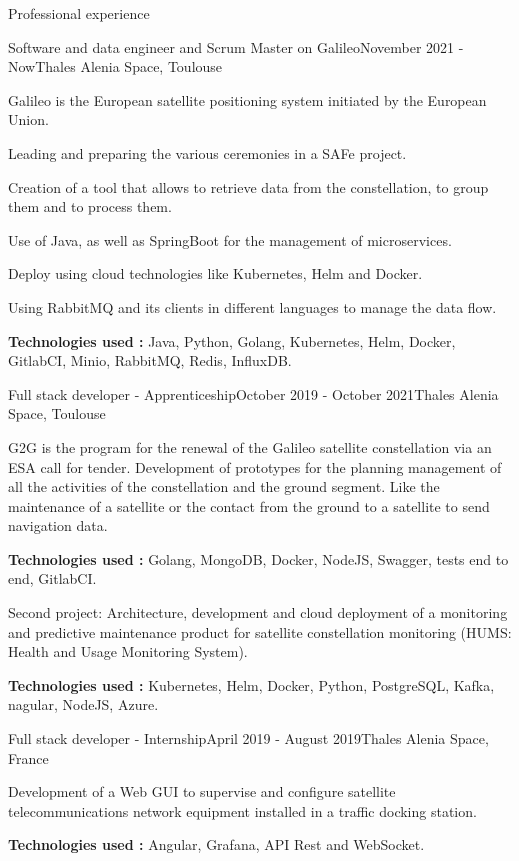 \documentclass[
	11pt, %
]{resume}
\begin{document}
\begin{rSection}{Professional experience}

	\begin{rSubsection}{Software and data engineer and Scrum Master on Galileo}{November 2021 - Now}{Thales Alenia Space, Toulouse}{}
		\item Galileo is the European satellite positioning system initiated by the European Union. 
		\item Leading and preparing the various ceremonies in a SAFe project.
		\item Creation of a tool that allows to retrieve data from the constellation, to group them and to process them.
 		\item Use of Java, as well as SpringBoot for the management of microservices.
 		\item Deploy using cloud technologies like Kubernetes, Helm and Docker.
 		\item Using RabbitMQ and its clients in different languages to manage the data flow.
		\item \textbf{Technologies used :} Java, Python, Golang, Kubernetes, Helm, Docker, GitlabCI, Minio, RabbitMQ, Redis, InfluxDB.
	\end{rSubsection}

	\begin{rSubsection}{Full stack developer - Apprenticeship}{October 2019 - October 2021}{Thales Alenia Space, Toulouse}{}
		\item G2G is the program for the renewal of the Galileo satellite constellation via an ESA call for tender. 
			Development of prototypes for the planning management of all the activities of the constellation and the ground segment. 
			Like the maintenance of a satellite or the contact from the ground to a satellite to send navigation data.
		\item \textbf{Technologies used :} Golang, MongoDB, Docker, NodeJS, Swagger, tests end to end, GitlabCI.
		\item Second project: Architecture, development and cloud deployment of a monitoring and predictive maintenance 
			product for satellite constellation monitoring (HUMS: Health and Usage Monitoring System).
		\item \textbf{Technologies used :} Kubernetes, Helm, Docker, Python, PostgreSQL, Kafka, nagular, NodeJS, Azure.
	\end{rSubsection}

	\begin{rSubsection}{Full stack developer - Internship}{April 2019 - August 2019}{Thales Alenia Space, France}{}
		\item Development of a Web GUI to supervise and configure satellite telecommunications network equipment installed in a traffic docking station.
		\item \textbf{Technologies used :} Angular, Grafana, API Rest and WebSocket.
	\end{rSubsection}


\end{rSection}
\end{document}
